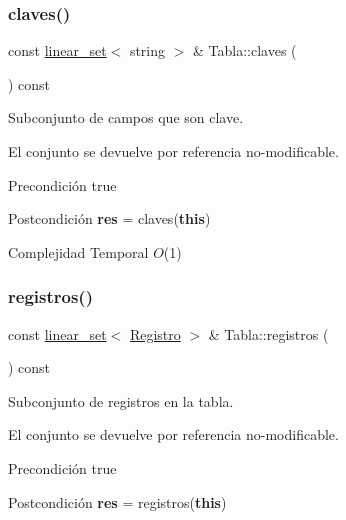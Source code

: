 \subsubsection{\texorpdfstring{claves()}{claves()}}
{\footnotesize\ttfamily const \mbox{\hyperlink{classlinear__set}{linear\+\_\+set}}$<$ string $>$ \& Tabla\+::claves (\begin{DoxyParamCaption}{ }\end{DoxyParamCaption}) const}



Subconjunto de campos que son clave. 

El conjunto se devuelve por referencia no-\/modificable.

\begin{DoxyPrecond}{Precondición}
true 
\end{DoxyPrecond}
\begin{DoxyPostcond}{Postcondición}
{\bfseries res} = claves({\bfseries this})
\end{DoxyPostcond}

\begin{DoxyDescription}
\item[Complejidad Temporal]$O$(1)
\end{DoxyDescription}\mbox{\label{classTabla_a11b94420ed8fa905471a34b41a5191ad}} 
\subsubsection{\texorpdfstring{registros()}{registros()}}
{\footnotesize\ttfamily const \mbox{\hyperlink{classlinear__set}{linear\+\_\+set}}$<$ \mbox{\hyperlink{classRegistro}{Registro}} $>$ \& Tabla\+::registros (\begin{DoxyParamCaption}{ }\end{DoxyParamCaption}) const}



Subconjunto de registros en la tabla. 

El conjunto se devuelve por referencia no-\/modificable.

\begin{DoxyPrecond}{Precondición}
true 
\end{DoxyPrecond}
\begin{DoxyPostcond}{Postcondición}
{\bfseries res} = registros({\bfseries this})
\end{DoxyPostcond}

